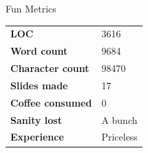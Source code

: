 \documentclass{beamer}
\begin{document}
\begin{frame}
\begin{block}{Fun Metrics}
\begin{tabular}{l l}
\textbf{LOC} & 3616 \\
\textbf{Word count} & 9684 \\
\textbf{Character count} & 98470 \\
\textbf{Slides made} & 17 \\
\textbf{Coffee consumed} & 0\\
\textbf{Sanity lost} & A bunch \\
\textbf{Experience} & Priceless 
\end{tabular}
\end{block}
\end{frame}

\begin{frame}
\end{frame}
\end{document}
